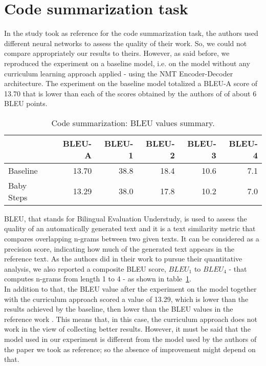 \section{Code summarization task}\label{section:cdtask}
In the study took as reference for the code summarization task, the authors used different neural networks to 
assess the quality of their work. So, we could not compare appropriately our results to theirs.
However, as said before, we reproduced the experiment on a baseline model,
i.e. on the model without any curriculum learning approach applied - using the NMT Encoder-Decoder architecture.
The experiment on the baseline model totalized a BLEU-A score of 13.70 that is lower than 
each of the scores obtained by the authors of \cite{Leclair2020} of about 6 BLEU points. 
\begin{table}[h!]
    \centering
    \begin{tabular}{l|r|r|r|r|r}
     & BLEU-A & BLEU-1 & BLEU-2 & BLEU-3 & BLEU-4\\ [0.5ex] 
     \hline
     Baseline & 13.70 & 38.8 & 18.4 & 10.6 & 7.1\\  
     Baby Steps & 13.29 & 38.0 & 17.8 & 10.2 & 7.0\\ [1ex]
     \end{tabular}
    \caption{Code summarization: BLEU values summary.}
    \label{table:1}
\end{table}
BLEU, that stands for Bilingual Evaluation Understudy, is used to assess the quality of an automatically 
generated text and it is a text similarity metric that compares
overlapping n-grams between two given texts. It can be considered as a precision score, indicating how much 
of the generated text appears in the reference text. 
As the authors did in their work to pursue their quantitative analysis, we also reported a composite BLEU score, $BLEU_1$ to 
$BLEU_4$ - that computes 
n-grams from length 1 to 4 - as shown in table~\ref{table:1}.\\
In addition to that, the BLEU value after the experiment on the model together with the curriculum approach
scored a value of 13.29, which is lower than the results achieved by the baseline, then lower than the BLEU values in the 
reference work \cite{Leclair2020}.
This means that, in this case, the curriculum approach does not work in the view of collecting better results.
However, it must be said that the model used in our experiment is different from the 
model used by the authors of the paper we took as reference; so the absence of improvement might
depend on that.\\
